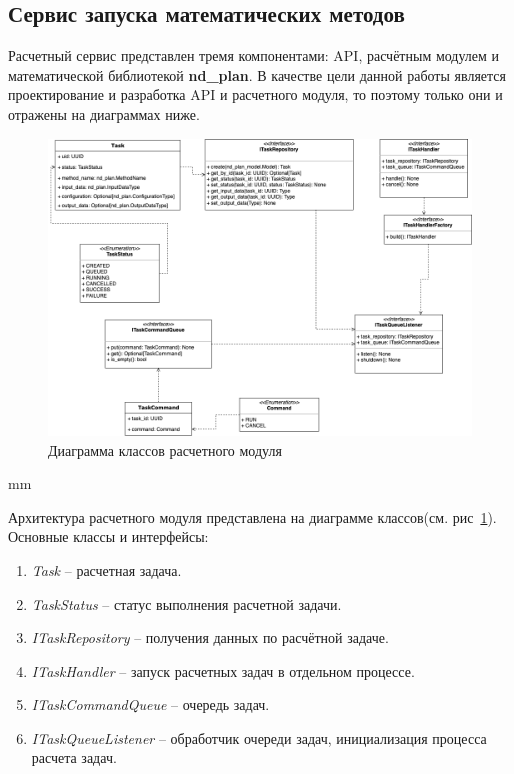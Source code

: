 \subsection*{\large{Сервис запуска математических методов}}

Расчетный сервис представлен тремя компонентами: API, расчётным модулем и математической библиотекой \textbf{nd\_plan}.
В качестве цели данной работы является проектирование и разработка API и расчетного модуля,
то поэтому только они и отражены на диаграммах ниже.

\begin{figure}[H]
	\hspace*{-2.5 cm}\includegraphics[width=1.2\textwidth]{architecture/pictures/executor/execution_classes_diagram}
	\caption{Диаграмма классов расчетного модуля}
	\label{pic:architecture__execution-classes-diagram}
\end{figure}
 mm

Архитектура расчетного модуля представлена на диаграмме классов(см. рис\ \ref{pic:architecture__execution-classes-diagram}).
Основные классы и интерфейсы:
\begin{enumerate}
	\item \textit{Task} -- расчетная задача.
	\item \textit{TaskStatus} -- статус выполнения расчетной задачи.
	\item \textit{ITaskRepository} -- получения данных по расчётной задаче.
	\item \textit{ITaskHandler} -- запуск расчетных задач в отдельном процессе.
	\item \textit{ITaskCommandQueue} -- очередь задач.
	\item \textit{ITaskQueueListener} -- обработчик очереди задач, инициализация процесса расчета задач.
\end{enumerate}


